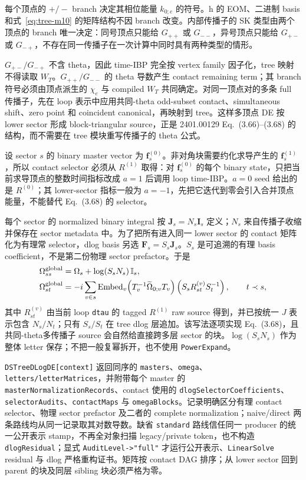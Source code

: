 ﻿\documentclass[a4paper,11pt]{article}
\begin{document}
每个顶点的 $+/-$ branch 决定其相位能量 $k_{0;e}$ 的符号。h 的 EOM、二进制 basis 和式~\eqref{eq:tree-m10} 的矩阵结构不因 branch 改变。内部传播子的 SK 类型由两个顶点的 branch 唯一决定：同号顶点只能给 $G_{++}$ 或 $G_{--}$，异号顶点只能给 $G_{+-}$ 或 $G_{-+}$，不存在同一传播子在一次计算中同时具有两种类型的情形。

$G_{+-}/G_{-+}$ 不含 theta，因此 time-IBP 完全按 vertex family 因子化，tree 映射不得读取 $W_T$。$G_{++}/G_{--}$ 的 theta 导数产生 contact remaining term；其 branch 符号必须由顶点派生的 $\chi_e$ 与 compiled $W_T$ 共同确定。对同一顶点对的多条 full 传播子，先在 loop 表示中应用共同-theta odd-subset contact、simultaneous shift、zero point 和 coincident canonical，再映射到 tree。这样多顶点 DE 按 lower sector 形成 block-triangular source，正是 2401.00129 Eq.~(3.66)--(3.68) 的结构，而不需要在 tree 模块重写传播子的 theta 公式。

设 sector $s$ 的 binary master vector 为 $\bm f_s^{(0)}$。非对角块需要约化求导产生的 $\bm f_s^{(1)}$，所以 contact selector 必须从 $R^{(1)}$ 取得：对 $\bm f_s^{(0)}$ 的每个 binary state，只把当前求导顶点的整数时间指标改成 $a=1$ 后调用 loop time-IBP。$a=0$ seed 给出的是 $R^{(0)}$；其 lower-sector 指标一般为 $a=-1$，先把它迭代到零会引入合并顶点能量，不能替代 Eq.~(3.68) 的 selector。

每个 sector 的 normalized binary integral 按 $\bm J_s=N_s\bm I_s$ 定义；$N_s$ 来自传播子收缩并保存在 sector metadata 中。为了把所有进入同一 lower sector 的 contact 矩阵化为有理常 selector，dlog basis 另选 $\bm F_s=S_s\bm J_s$。$S_s$ 是可追溯的有理 basis coefficient，不是第二份物理 sector prefactor。于是
\begin{align}
 \Omega_{ss}^{\rm global}&=\Omega_s+\log(S_sN_s)\,\mathbb I_s,\\
 \Omega_{st}^{\rm global}&=-i\sum_{v\in s}
 \operatorname{Embed}_v\!\left(T_v^{-1}\widetilde\Omega_{0;v}T_v\right)
 \left(S_sR_{st}^{(v)}S_t^{-1}\right),\qquad t\prec s,
 \label{eq:tree-sector-offdiagonal}
\end{align}
其中 $R_{st}^{(v)}$ 由当前 loop \texttt{dtau} 的 tagged $R^{(1)}$ raw source 得到，并已按统一 $J$ 表示包含 $N_s/N_t$；只有 $S_s/S_t$ 在 tree dlog 层追加。该写法逐项实现 Eq.~(3.68)，且共同-theta多传播子 source 会自然给直接跨多层 sector 的块。$\log(S_sN_s)$ 作为整体 letter 保存；不把一般复幂拆开，也不使用 \texttt{PowerExpand}。

\texttt{DSTreeDLogDE[context]} 返回同序的 \texttt{masters}、\texttt{omega}、\texttt{letters/letterMatrices}，并附带每个 master 的 \texttt{masterNormalizationRecords}、contact 使用的 \texttt{dlogSelectorCoefficients}、\texttt{selectorAudits}、\texttt{contactMaps} 与 \texttt{omegaBlocks}。记录明确区分有理 contact selector、物理 sector prefactor 及二者的 complete normalization；naive/direct 两条路线均从同一记录取其对数导数。缺省 \texttt{standard} 路线信任同一 producer 的统一公开表示 stamp，不再全对象扫描 legacy/private token，也不构造 \texttt{dlogResidual}；显式 \texttt{AuditLevel->"full"} 才运行公开表示、\texttt{LinearSolve} residual 与 dlog 严格重构证书。矩阵按 contact DAG 排序；从 lower sector 回到 parent 的块及同层 sibling 块必须严格为零。
\end{document}

